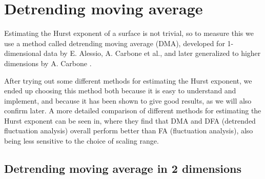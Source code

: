 \section{Detrending moving average\label{sec:dma}}
%
Estimating the Hurst exponent of a surface is not trivial, so to measure this we use a method called detrending moving average (DMA), developed for 1-dimensional data by E. Alessio, A. Carbone et al.\cite{alessio2002dma}, and later generalized to higher dimensions by A. Carbone \cite{carbone2007algorithm}. 

After trying out some different methods for estimating the Hurst exponent, we ended up choosing this method both because it is easy to understand and implement, and because it has been shown to give good results, as we will also confirm later. A more detailed comparison of different methods for estimating the Hurst exponent can be seen in\cite{shao2012comparing}, where they find that DMA and DFA (detrended fluctuation analysis) overall perform better than FA (fluctuation analysis), also being less sensitive to the choice of scaling range.%

\subsection{Detrending moving average in 2 dimensions}


